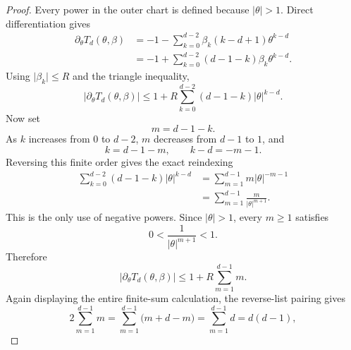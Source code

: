 \begin{proof}
Every power in the outer chart is defined because \(\lvert\theta\rvert>1\). Direct differentiation gives
\begin{equation}
\label{eq:appendix-display-286}
\begin{aligned}
\partial_\theta T_d(\theta,\beta)
&=-1-\sum_{k=0}^{d-2}\beta_k(k-d+1)\theta^{k-d}\\
&=-1+\sum_{k=0}^{d-2}(d-1-k)\beta_k\theta^{k-d}.
\end{aligned}
\end{equation}
Using \(\lvert\beta_k\rvert\leq R\) and the triangle inequality,
\begin{equation}
\label{eq:appendix-display-287}
\lvert\partial_\theta T_d(\theta,\beta)\rvert
\leq1+R\sum_{k=0}^{d-2}(d-1-k)\lvert\theta\rvert^{k-d}.
\end{equation}
Now set
\begin{equation}
\label{eq:appendix-display-288}
m=d-1-k.
\end{equation}
As \(k\) increases from \(0\) to \(d-2\), \(m\) decreases from \(d-1\) to \(1\), and
\begin{equation}
\label{eq:appendix-display-289}
k=d-1-m,
\qquad
k-d=-m-1.
\end{equation}
Reversing this finite order gives the exact reindexing
\begin{equation}
\label{eq:appendix-display-290}
\begin{aligned}
\sum_{k=0}^{d-2}(d-1-k)\lvert\theta\rvert^{k-d}
&=\sum_{m=1}^{d-1}m\lvert\theta\rvert^{-m-1}\\
&=\sum_{m=1}^{d-1}\frac{m}{\lvert\theta\rvert^{m+1}}.
\end{aligned}
\end{equation}
This is the only use of negative powers. Since \(\lvert\theta\rvert>1\), every \(m\geq1\) satisfies
\begin{equation}
\label{eq:appendix-display-291}
0<\frac1{\lvert\theta\rvert^{m+1}}<1.
\end{equation}
Therefore
\begin{equation}
\label{eq:appendix-display-292}
\lvert\partial_\theta T_d(\theta,\beta)\rvert
\leq1+R\sum_{m=1}^{d-1}m.
\end{equation}
Again displaying the entire finite-sum calculation, the reverse-list pairing gives
\begin{equation}
\label{eq:appendix-display-293}
2\sum_{m=1}^{d-1}m
=\sum_{m=1}^{d-1}\bigl(m+d-m\bigr)
=\sum_{m=1}^{d-1}d
=d(d-1),
\end{equation}

\end{proof}
